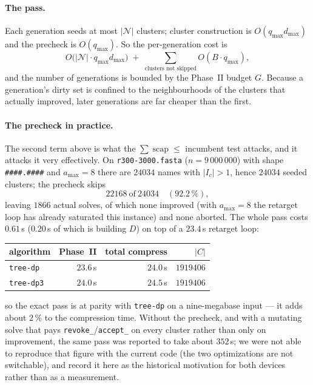 \documentclass[11pt,a4paper]{article}
\theoremstyle{definition}
\theoremstyle{plain}
\theoremstyle{remark}
\newcommand{\Names}{\mathcal{N}}
\newcommand{\scap}{\operatorname{scap}}
\begin{document}
\paragraph{The pass.}
Each generation seeds at most $|\Names|$ clusters; cluster construction is
$O(q_{\max} d_{\max})$ and the precheck is $O(q_{\max})$. So the
per-generation cost is
\[
  O\bigl(|\Names| \cdot q_{\max} d_{\max}\bigr)
  \;+\;
  \sum_{\text{clusters not skipped}} O(B \cdot q_{\max}),
\]
and the number of generations is bounded by the Phase~II budget $G$.
Because a generation's dirty set is confined to the neighbourhoods of the
clusters that actually improved, later generations are far cheaper than
the first.

\paragraph{The precheck in practice.}
The second term above is what the $\sum \scap \le$ incumbent test
attacks, and it attacks it very effectively. On
\texttt{r300-3000.fasta} ($n = 9\,000\,000$) with shape
\texttt{\#\#\#\#.\#\#\#\#} and $a_{\max} = 8$ there are $24034$ names with
$|I_c| > 1$, hence $24034$ seeded clusters; the precheck skips
\[
  22168 \ \text{of}\ 24034 \quad (92.2\,\%),
\]
leaving $1866$ actual solves, of which none improved (with $a_{\max}=8$
the retarget loop has already saturated this instance) and none aborted.
The whole pass costs $0.61$\,s ($0.20$\,s of which is building $D$) on top
of a $23.4$\,s retarget loop:

\begin{center}
\begin{tabular}{@{}lrrr@{}}
\toprule
algorithm & Phase~II & total compress & $|C|$ \\
\midrule
\texttt{tree-dp}  & $23.6$\,s & $24.0$\,s & $1919406$ \\
\texttt{tree-dp3} & $24.0$\,s & $24.5$\,s & $1919406$ \\
\bottomrule
\end{tabular}
\end{center}

so the exact pass is at parity with \texttt{tree-dp} on a nine-megabase
input --- it adds about $2\,\%$ to the compression time. Without the
precheck, and with a mutating solve that pays
\texttt{revoke\_}/\texttt{accept\_} on every cluster rather than only on
improvement, the same pass was reported to take about $352$\,s; we were
not able to reproduce that figure with the current code (the two
optimizations are not switchable), and record it here as the historical
motivation for both devices rather than as a measurement.
\end{document}
